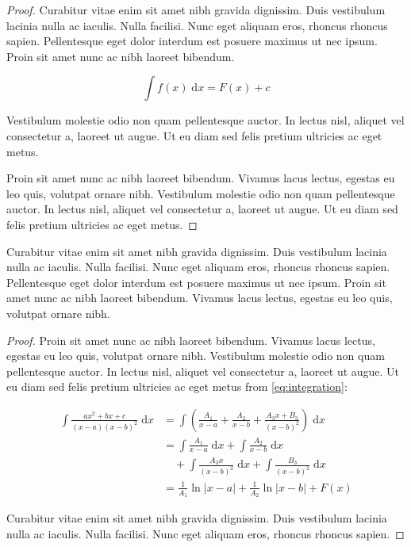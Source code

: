 \begin{proof}
Curabitur vitae enim sit amet nibh gravida dignissim. Duis vestibulum lacinia nulla ac iaculis. Nulla facilisi. Nunc eget aliquam eros, rhoncus rhoncus sapien. Pellentesque eget dolor interdum est posuere maximus ut nec ipsum. Proin sit amet nunc ac nibh laoreet bibendum. 

\[ \int f(x) \;\mathrm{d}x = F(x) + c \]

Vestibulum molestie odio non quam pellentesque auctor. In lectus nisl, aliquet vel consectetur a, laoreet ut augue. Ut eu diam sed felis pretium ultricies ac eget metus.

Proin sit amet nunc ac nibh laoreet bibendum. Vivamus lacus lectus, egestas eu leo quis, volutpat ornare nibh. Vestibulum molestie odio non quam pellentesque auctor. In lectus nisl, aliquet vel consectetur a, laoreet ut augue. Ut eu diam sed felis pretium ultricies ac eget metus.
\end{proof}

\begin{theorem}
Curabitur vitae enim sit amet nibh gravida dignissim. Duis vestibulum lacinia nulla ac iaculis. Nulla facilisi. Nunc eget aliquam eros, rhoncus rhoncus sapien. Pellentesque eget dolor interdum est posuere maximus ut nec ipsum. Proin sit amet nunc ac nibh laoreet bibendum. Vivamus lacus lectus, egestas eu leo quis, volutpat ornare nibh.
\end{theorem}

\begin{proof}
Proin sit amet nunc ac nibh laoreet bibendum. Vivamus lacus lectus, egestas eu leo quis, volutpat ornare nibh. Vestibulum molestie odio non quam pellentesque auctor. In lectus nisl, aliquet vel consectetur a, laoreet ut augue. Ut eu diam sed felis pretium ultricies ac eget metus from \eqref{eq:integration}:

\begin{align}
\int \frac{ax^2+bx+c}{(x-a)(x-b)^2} \;\mathrm{d}x
& = \int \left( \frac{A_1}{x-a} + \frac{A_2}{x-b} + \frac{A_3x+B_3}{(x-b)^2} \right) \;\mathrm{d}x
\\ \nonumber
& = \int \frac{A_1}{x-a} \;\mathrm{d}x + \int \frac{A_2}{x-b} \;\mathrm{d}x 
\\
& \quad + \int \frac{A_3x}{(x-b)^2} \;\mathrm{d}x + \int \frac{B_3}{(x-b)^2} \;\mathrm{d}x
\\
& = \frac{1}{A_1} \ln \lvert x-a \rvert + \frac{1}{A_2}\ln \lvert x-b \rvert + F(x)
\end{align}

Curabitur vitae enim sit amet nibh gravida dignissim. Duis vestibulum lacinia nulla ac iaculis. Nulla facilisi. Nunc eget aliquam eros, rhoncus rhoncus sapien. 	
\end{proof}


